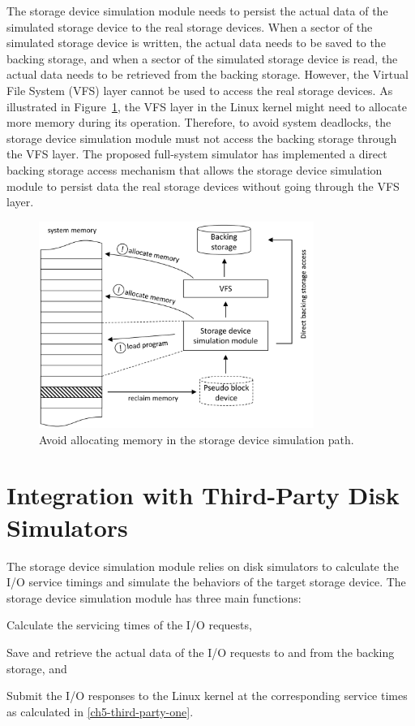 The storage device simulation module needs to persist the actual data of the simulated storage device to the real storage devices.  When a sector of the simulated storage device is written, the actual data needs to be saved to the backing storage, and when a sector of the simulated storage device is read, the actual data needs to be retrieved from the backing storage. However, the Virtual File System (VFS) layer cannot be used to access the real storage devices. As illustrated in Figure~\ref{fig:ch5-direct-backing-storage}, the VFS layer in the Linux kernel might need to allocate more memory during its operation. Therefore, to avoid system deadlocks, the storage device simulation module must not access the backing storage through the VFS layer. The proposed full-system simulator has implemented a direct backing storage access mechanism that allows the storage device simulation module to persist data the real storage devices without going through the VFS layer.

\begin{figure}[htpb!]
	\centering
	\includegraphics[width=0.8\textwidth]{figures/ch5-direct-backing-storage.pdf}
	\caption{\label{fig:ch5-direct-backing-storage}Avoid allocating memory in the storage device simulation path.}
\end{figure}


\section{Integration with Third-Party Disk Simulators}
\label{sec:disk-simulator-integration}

The storage device simulation module relies on disk simulators to calculate the I/O service timings and simulate the behaviors of the target storage device. The storage device simulation module has three main functions:
\begin{enumerate*}[label=(\arabic*)]
	\item \label{ch5-third-party-one} Calculate the servicing times of the I/O requests, 
	\item \label{ch5-third-party-two} Save and retrieve the actual data of the I/O requests to and from the backing storage, and
	\item \label{ch5-third-party-three} Submit the I/O responses to the Linux kernel at the corresponding service times as calculated in \ref{ch5-third-party-one}.
\end{enumerate*}

